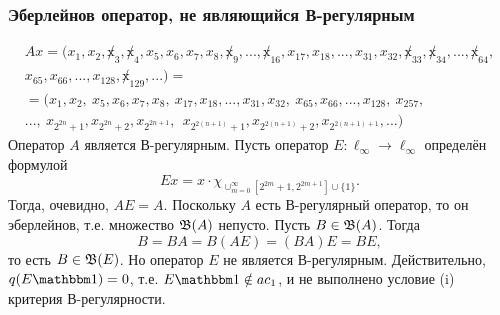 \begin{frame}\frametitle{Эберлейнов оператор, не являющийся В-регулярным}
	\begin{multline}
		\label{eq:oper_A_throws_out_2power_blocks}
		Ax = (x_1, x_2, \not x_3, \not x_4, x_5, x_6, x_7, x_8, \not x_9, ..., \not x_{16}, x_{17}, x_{18}, ..., x_{31}, x_{32}, \not x_{33}, \not x_{34}, ..., \not x_{64},
		\\
		x_{65}, x_{66}, ..., x_{128}, \not x_{129}, ...)=
		\\=
		(x_1, x_2, \ x_5, x_6, x_7, x_8, \ x_{17}, x_{18}, ..., x_{31}, x_{32}, \ x_{65}, x_{66}, ..., x_{128}, \ x_{257},
		\\
		..., \ x_{2^{2n} +1}, x_{2^{2n} +2},  x_{2^{2n+1}}, \ \ x_{2^{2(n+1)} +1},  x_{2^{2(n+1)} +2},  x_{2^{2(n+1)+1}}, ...)
	\end{multline}
	Оператор $A$ является В-регулярным.
	Пусть оператор $E:\ell_\infty\to\ell_\infty$ определён формулой
	\begin{equation}
		Ex = x \cdot \chi_{\cup_{m=0}^{\infty}\left[2^{2 m}+1, 2^{2 m+1}\right] \cup\{1\}}
		.
	\end{equation}
	Тогда, очевидно, $AE=A$.
	Поскольку $A$ есть В-регулярный оператор, то он эберлейнов,
	т.е. множество $\mathfrak{B}(A)$ непусто.
	Пусть $B\in\mathfrak{B}(A)$. Тогда
	\begin{equation}
		B = BA = B(AE) = (BA)E = BE
		,
	\end{equation}
	то есть $B\in\mathfrak{B}(E)$.
	Но оператор $E$ не является В-регулярным.
	Действительно, $q(E\one) =0$, т.е. $ E\one \notin ac_1$,
	и не выполнено условие (i) критерия В-регулярности.
\end{frame}

